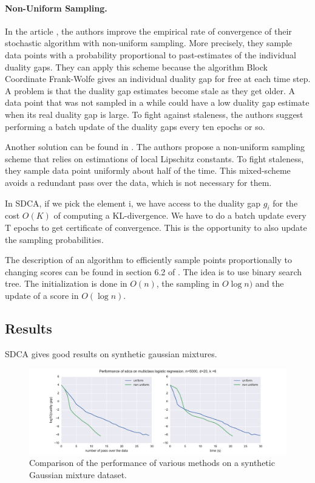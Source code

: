 \documentclass{article}
\DeclareMathOperator{\1}{\mathbb{1}}
\begin{document}
\paragraph{Non-Uniform Sampling.} 
In the article \cite{osokin_minding_2016}, the authors improve the empirical rate of convergence of their stochastic algorithm with non-uniform sampling.
More precisely, they sample data points with a probability proportional to past-estimates of the individual duality gaps.
They can apply this scheme because the algorithm Block Coordinate Frank-Wolfe \cite{lacoste-julien_block-coordinate_2012} gives an individual duality gap for free at each time step.
A problem is that the duality gap estimates become stale as they get older.
A data point that was not sampled in a while could have a low duality gap estimate when its real duality gap is large.
To fight against staleness, the authors suggest performing a batch update of the duality gaps every ten epochs or so.

Another solution can be found in \cite{schmidt_non-uniform_2015}.
The authors propose a non-uniform sampling scheme that relies on estimations of local Lipschitz constants.
To fight staleness, they sample data point uniformly about half of the time.
This mixed-scheme avoids a redundant pass over the data, which is not necessary for them.

In SDCA, if we pick the element i, we have access to the duality gap $g_i$ for the cost $O(K)$ of computing a KL-divergence.
We have to do a batch update every T epochs to get certificate of convergence.
This is the opportunity to also update the sampling probabilities.

The description of an algorithm to efficiently sample points proportionally to changing scores can be found in section 6.2 of \cite{nesterov_efficiency_2012}.
The idea is to use binary search tree.
The initialization is done in $O(n)$, the sampling in $O\log n)$ and the update of a score in $O(\log n)$.

\subsection{Results}

SDCA gives good results on synthetic gaussian mixtures. 
\begin{figure}[ht]
	\label{gmm results}
	\includegraphics[width=\textwidth]{images/nonuniform_is_better.pdf}
	\caption{Comparison of the performance of various methods on a synthetic Gaussian mixture dataset.}
\end{figure}
\end{document}
